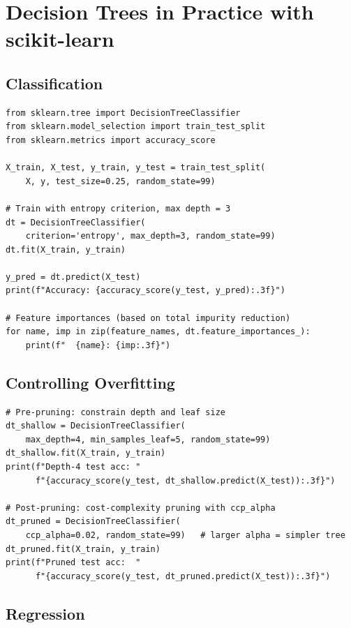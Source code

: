 \section*{Decision Trees in Practice with scikit-learn}

\subsection*{Classification}

\begin{lstlisting}[style=pythonstyle]
from sklearn.tree import DecisionTreeClassifier
from sklearn.model_selection import train_test_split
from sklearn.metrics import accuracy_score

X_train, X_test, y_train, y_test = train_test_split(
    X, y, test_size=0.25, random_state=99)

# Train with entropy criterion, max depth = 3
dt = DecisionTreeClassifier(
    criterion='entropy', max_depth=3, random_state=99)
dt.fit(X_train, y_train)

y_pred = dt.predict(X_test)
print(f"Accuracy: {accuracy_score(y_test, y_pred):.3f}")

# Feature importances (based on total impurity reduction)
for name, imp in zip(feature_names, dt.feature_importances_):
    print(f"  {name}: {imp:.3f}")
\end{lstlisting}

\subsection*{Controlling Overfitting}

\begin{lstlisting}[style=pythonstyle]
# Pre-pruning: constrain depth and leaf size
dt_shallow = DecisionTreeClassifier(
    max_depth=4, min_samples_leaf=5, random_state=99)
dt_shallow.fit(X_train, y_train)
print(f"Depth-4 test acc: "
      f"{accuracy_score(y_test, dt_shallow.predict(X_test)):.3f}")

# Post-pruning: cost-complexity pruning with ccp_alpha
dt_pruned = DecisionTreeClassifier(
    ccp_alpha=0.02, random_state=99)   # larger alpha = simpler tree
dt_pruned.fit(X_train, y_train)
print(f"Pruned test acc:  "
      f"{accuracy_score(y_test, dt_pruned.predict(X_test)):.3f}")
\end{lstlisting}

\subsection*{Regression}

